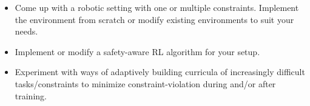 \documentclass[a4paper]{article}
\begin{document}
\begin{itemize}
	\item Come up with a robotic setting with one or multiple constraints. Implement the environment from scratch or modify existing environments to suit your needs.  
	\item Implement or modify a safety-aware RL algorithm for your setup. 
	\item Experiment with ways of adaptively building curricula of increasingly difficult tasks/constraints to minimize constraint-violation during and/or after training.
\end{itemize}




\end{document}
